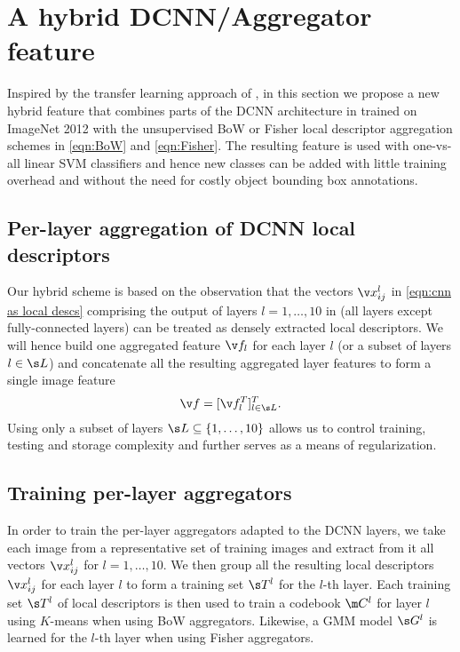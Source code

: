 \documentclass{article}
\begin{document}
\section{A hybrid DCNN/Aggregator feature}\label{proposed}
Inspired by the transfer learning approach of \cite{Oquaba}, in this section we propose a new hybrid feature that combines parts of the DCNN architecture in  trained on ImageNet 2012 with the unsupervised BoW or Fisher local descriptor aggregation schemes in \eqref{eqn:BoW} and \eqref{eqn:Fisher}. The resulting feature is used with one-vs-all linear SVM classifiers and hence new classes can be added with little training overhead and without the need for costly object bounding box annotations.

\subsection{Per-layer aggregation of DCNN local descriptors}
\label{hybrid}
Our hybrid scheme is based on the observation that the vectors $\v x^l_{ij}$ in \eqref{eqn:cnn as local descs} comprising the output of layers $l=1,\ldots,10$ in  (\ie all layers except fully-connected layers) can be treated as densely extracted local descriptors. We will hence build one aggregated feature $\v f_l$ for each layer $l$ (or a subset of layers $l \in \s L$) and concatenate all the resulting aggregated layer features to form a single image feature 
\begin{equation} \label{eqn:hybrid}
\v f = [\v f_l^T]_{l\in \s L}^T.
\end{equation}
Using only a subset of layers $\s L \subseteq \{1,\ldots,10\}$ allows us to control training, testing and storage complexity and further serves as a means of regularization.


\subsection{Training per-layer aggregators}
In order to train the per-layer aggregators adapted to the DCNN layers, we take each image from a representative set of training images and extract from it all vectors $\v x^l_{ij}$ for $l=1,\ldots,10$. We then group all the resulting local descriptors $\v x^l_{ij}$ for each layer $l$ to form a training set $\s T^l$ for the $l$-th layer. Each training set $\s T^l$ of local descriptors is then used to train a codebook $\m C^l$ for layer $l$ using $K$-means when using BoW aggregators. Likewise, a GMM model $\s G^l$ is learned for the $l$-th layer when using Fisher aggregators.
\end{document}
